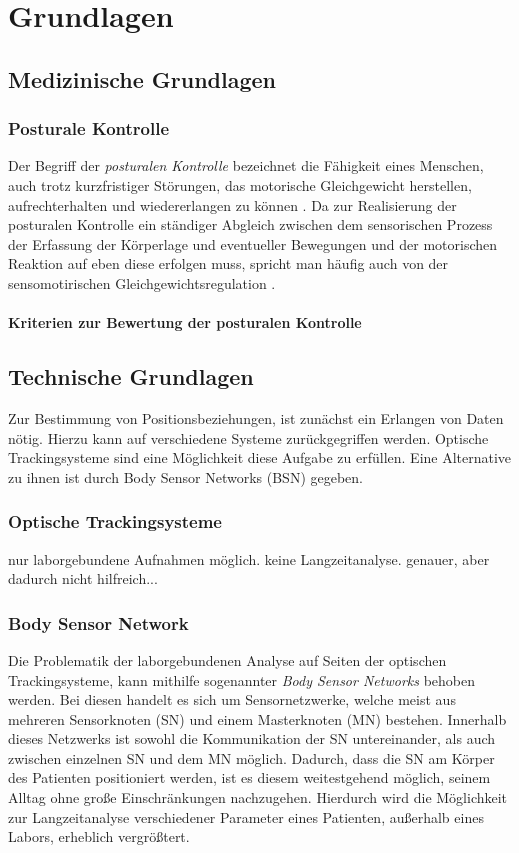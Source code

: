 \chapter{Grundlagen}

\section{Medizinische Grundlagen}

\subsection{Posturale Kontrolle}
Der Begriff der \textit{posturalen Kontrolle} bezeichnet die Fähigkeit eines Menschen, auch trotz kurzfristiger Störungen, das motorische Gleichgewicht herstellen, aufrechterhalten und wiedererlangen zu können \cite{PK1}.
Da zur Realisierung der posturalen Kontrolle ein ständiger Abgleich zwischen dem sensorischen Prozess der Erfassung der Körperlage und eventueller Bewegungen und der motorischen Reaktion auf eben diese erfolgen muss, spricht man häufig auch von der sensomotirischen Gleichgewichtsregulation \cite{PK2}.

\subsubsection{Kriterien zur Bewertung der posturalen Kontrolle}


\section{Technische Grundlagen}
Zur Bestimmung von Positionsbeziehungen, ist zunächst ein Erlangen von Daten nötig.
Hierzu kann auf verschiedene Systeme zurückgegriffen werden.
Optische Trackingsysteme sind eine Möglichkeit diese Aufgabe zu erfüllen.
Eine Alternative zu ihnen ist durch Body Sensor Networks (BSN) gegeben.

\subsection{Optische Trackingsysteme}
 nur laborgebundene Aufnahmen möglich.
 keine Langzeitanalyse.
 genauer, aber dadurch nicht hilfreich...

\subsection{Body Sensor Network}
Die Problematik der laborgebundenen Analyse auf Seiten der optischen Trackingsysteme, kann mithilfe sogenannter \textit{Body Sensor Networks} behoben werden.
Bei diesen handelt es sich um Sensornetzwerke, welche meist aus mehreren Sensorknoten (SN) und einem Masterknoten (MN) bestehen.
Innerhalb dieses Netzwerks ist sowohl die Kommunikation der SN untereinander, als auch zwischen einzelnen SN und dem MN möglich.
Dadurch, dass die SN am Körper des Patienten positioniert werden, ist es diesem weitestgehend möglich, seinem Alltag ohne große Einschränkungen nachzugehen.
Hierdurch wird die Möglichkeit zur Langzeitanalyse verschiedener Parameter eines Patienten, außerhalb eines Labors, erheblich vergrößtert.

